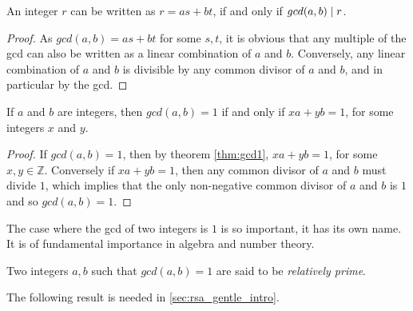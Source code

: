  \begin{corollary}
    \label{cor:multiples_of_gcd}
    An integer $r$ can be written as $r = as+bt$, if and only if $gcd(a,b)\mathrel{|} r$.
  \end{corollary}
  \begin{proof}
    As $gcd(a, b) = as + bt$ for some $s, t$, it is obvious that any multiple of the gcd can also be written as a linear combination of $a$ and $b$. Conversely, any linear combination of $a$ and $b$ is divisible by any common divisor of $a$ and $b$, and in particular by the gcd. 
  \end{proof}
  \begin{theorem}
    \label{thm:relprime1}
    If $a$ and $b$ are integers, then $gcd(a, b) = 1$ if and only if $xa + yb = 1$, for some integers $x$ and $y$.
  \end{theorem}
  \begin{proof}
    If $gcd(a, b)=1$, then by theorem \ref{thm:gcd1}, $xa + yb = 1$, for some $x, y\in \mathbb{Z}$. Conversely if $xa + yb = 1$, then any common divisor of $a$ and $b$ must divide $1$, which implies that the only non-negative common divisor of $a$ and $b$ is $1$\emd and so $gcd(a, b) = 1$.
  \end{proof}

  \noindent The case where the gcd of two integers is $1$ is so important, it has its own name. It is of fundamental importance in algebra and number theory.
  \begin{definition}
    \label{def:rel_prime}
    Two integers $a, b$ such that $gcd(a, b) = 1$ are said to be \emph{relatively prime}.
  \end{definition}

  \noindent The following result is needed in \ts\ref{sec:rsa_gentle_intro}.
  
